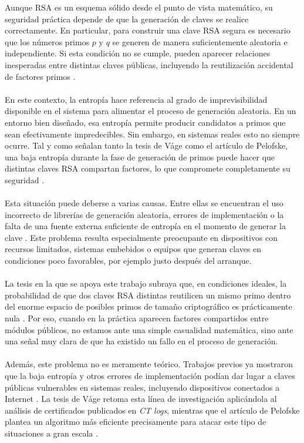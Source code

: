 Aunque RSA es un esquema sólido desde el punto de vista matemático, su seguridad práctica depende de que la generación de claves se realice correctamente. En particular, para construir una clave RSA segura es necesario que los números primos \(p\) y \(q\) se generen de manera suficientemente aleatoria e independiente. Si esta condición no se cumple, pueden aparecer relaciones inesperadas entre distintas claves públicas, incluyendo la reutilización accidental de factores primos \cite{heninger2012mining,vage2022finding,pelofske2024efficient}.
\\
\\
En este contexto, la entropía hace referencia al grado de imprevisibilidad disponible en el sistema para alimentar el proceso de generación aleatoria. En un entorno bien diseñado, esa entropía permite producir candidatos a primos que sean efectivamente impredecibles. Sin embargo, en sistemas reales esto no siempre ocurre. Tal y como señalan tanto la tesis de Våge como el artículo de Pelofske, una baja entropía durante la fase de generación de primos puede hacer que distintas claves RSA compartan factores, lo que compromete completamente su seguridad \cite{vage2022finding,pelofske2024efficient}.
\\
\\
Esta situación puede deberse a varias causas. Entre ellas se encuentran el uso incorrecto de librerías de generación aleatoria, errores de implementación o la falta de una fuente externa suficiente de entropía en el momento de generar la clave \cite{pelofske2024efficient}. Este problema resulta especialmente preocupante en dispositivos con recursos limitados, sistemas embebidos o equipos que generan claves en condiciones poco favorables, por ejemplo justo después del arranque.
\\
\\
La tesis en la que se apoya este trabajo subraya que, en condiciones ideales, la probabilidad de que dos claves RSA distintas reutilicen un mismo primo dentro del enorme espacio de posibles primos de tamaño criptográfico es prácticamente nula \cite{vage2022finding}. Por eso, cuando en la práctica aparecen factores compartidos entre módulos públicos, no estamos ante una simple casualidad matemática, sino ante una señal muy clara de que ha existido un fallo en el proceso de generación.
\\
\\
Además, este problema no es meramente teórico. Trabajos previos ya mostraron que la baja entropía y otros errores de implementación podían dar lugar a claves públicas vulnerables en sistemas reales, incluyendo dispositivos conectados a Internet \cite{heninger2012mining}. La tesis de Våge retoma esta línea de investigación aplicándola al análisis de certificados publicados en \textit{CT logs}, mientras que el artículo de Pelofske plantea un algoritmo más eficiente precisamente para atacar este tipo de situaciones a gran escala \cite{vage2022finding,pelofske2024efficient}.
